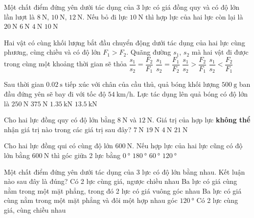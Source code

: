 \begin{ex}
	Một chất điểm đứng yên dưới tác dụng của 3 lực có giá đồng quy và có độ lớn lần lượt là $\SI{8}{\newton}$, $\SI{10}{\newton}$, $\SI{12}{\newton}$. Nếu bỏ đi lực $\SI{10}{\newton}$ thì hợp lực của hai lực còn lại là
	\choice
	{$\SI{20}{\newton}$}
	{$\SI{6}{\newton}$}
	{$\SI{4}{\newton}$}
	{\True $\SI{10}{\newton}$}
	\loigiai{}
\end{ex}
\begin{ex}
	Hai vật có cùng khối lượng bắt đầu chuyển động dưới tác dụng của hai lực cùng phương, cùng chiều và có độ lớn $F_1>F_2$. Quãng đường $s_1$, $s_2$ mà hai vật đi được trong cùng một khoảng thời gian sẽ thỏa
	\choice
	{$\dfrac{s_1}{s_2}=\dfrac{F_2}{F_1}$}
	{\True $\dfrac{s_1}{s_2}=\dfrac{F_1}{F_2}$}
	{$\dfrac{s_1}{s_2}>\dfrac{F_2}{F_1}$}
	{$\dfrac{s_1}{s_2}<\dfrac{F_2}{F_1}$}
	\loigiai{}
\end{ex}
\begin{ex}
Sau thời gian $\SI{0.02}{\second}$ tiếp xúc với chân của cầu thủ, quả bóng khối lượng $\SI{500}{\gram}$ ban đầu đứng yên sẽ bay đi với tốc độ $\SI{54}{\kilo\meter/\hour}$. Lực tác dụng lên quả bóng có độ lớn là	
	\choice
	{$\SI{250}{\newton}$}
	{\True $\SI{375}{\newton}$}
	{$\SI{1.35}{\kilo\newton}$}
	{$\SI{13.5}{\kilo\newton}$}
	\loigiai{}
\end{ex}
\begin{ex}
	Cho hai lực đồng quy có độ lớn bằng $\SI{8}{\newton}$ và $\SI{12}{\newton}$. Giá trị của hợp lực \textbf{không thể} nhận giá trị nào trong các giá trị sau đây?
	\choice
	{$\SI{7}{\newton}$}
	{$\SI{19}{\newton}$}
	{$\SI{4}{\newton}$}
	{\True $\SI{21}{\newton}$}
	\loigiai{}
\end{ex}
\begin{ex}
	Cho hai lực đồng qui có cùng độ lớn $\SI{600}{\newton}$. Nếu hợp lực của hai lực cũng có độ lớn bằng $\SI{600}{\newton}$ thì góc giữa 2 lực bằng
	\choice
	{$\SI{0}{\degree}$}
	{$\SI{180}{\degree}$}
	{$\SI{60}{\degree}$}
	{\True $\SI{120}{\degree}$}
	\loigiai{}
\end{ex}
\begin{ex}
	Một chất điểm đứng yên dưới tác dụng của 3 lực có độ lớn bằng nhau. Kết luận nào sau đây là đúng?
	\choice
	{Có 2 lực cùng giá, ngược chiều nhau}
	{Ba lực có giá cùng nằm trong một mặt phẳng, trong đó 2 lực có giá vuông góc nhau}
	{\True Ba lực có giá cùng nằm trong một mặt phẳng và đôi một hợp nhau góc $\SI{120}{\degree}$}
	{Có 2 lực cùng giá, cùng chiều nhau}
	\loigiai{}
\end{ex}
